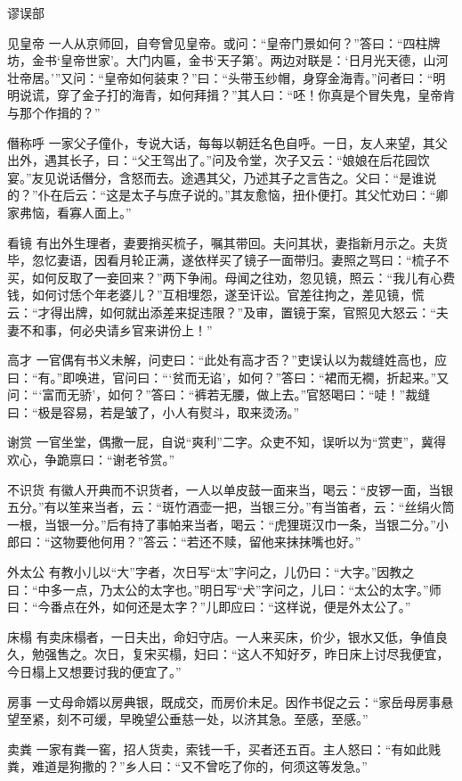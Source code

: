 \documentclass[12pt,UTF8]{ctexbook}
\begin{document}
谬误部

见皇帝
一人从京师回，自夸曾见皇帝。或问：“皇帝门景如何？”答曰：“四柱牌坊，金书‘皇帝世家’。大门内匾，金书‘天子第’。两边对联是：‘日月光天德，山河壮帝居。’”又问：“皇帝如何装束？”曰：“头带玉纱帽，身穿金海青。”问者曰：“明明说谎，穿了金子打的海青，如何拜揖？”其人曰：“呸！你真是个冒失鬼，皇帝肯与那个作揖的？”

僭称呼
一家父子僮仆，专说大话，每每以朝廷名色自呼。一日，友人来望，其父出外，遇其长子，曰：“父王驾出了。”问及令堂，次子又云：“娘娘在后花园饮宴。”友见说话僭分，含怒而去。途遇其父，乃述其子之言告之。父曰：“是谁说的？”仆在后云：“这是太子与庶子说的。”其友愈恼，扭仆便打。其父忙劝曰：“卿家弗恼，看寡人面上。”

看镜
有出外生理者，妻要捎买梳子，嘱其带回。夫问其状，妻指新月示之。夫货毕，忽忆妻语，因看月轮正满，遂依样买了镜子一面带归。妻照之骂曰：“梳子不买，如何反取了一妾回来？”两下争闹。母闻之往劝，忽见镜，照云：“我儿有心费钱，如何讨恁个年老婆儿？”互相埋怨，遂至讦讼。官差往拘之，差见镜，慌云：“才得出牌，如何就出添差来捉违限？”及审，置镜于案，官照见大怒云：“夫妻不和事，何必央请乡官来讲份上！”

高才
一官偶有书义未解，问吏曰：“此处有高才否？”吏误认以为裁缝姓高也，应曰：“有。”即唤进，官问曰：“‘贫而无谄’，如何？”答曰：“裙而无襉，折起来。”又问：“‘富而无骄’，如何？”答曰：“裤若无腰，做上去。”官怒喝曰：“唗！”裁缝曰：“极是容易，若是皱了，小人有熨斗，取来烫汤。”

谢赏
一官坐堂，偶撒一屁，自说“爽利”二字。众吏不知，误听以为“赏吏”，冀得欢心，争跪禀曰：“谢老爷赏。”

不识货
有徽人开典而不识货者，一人以单皮鼓一面来当，喝云：“皮锣一面，当银五分。”有以笙来当者，云：“斑竹酒壶一把，当银三分。”有当笛者，云：“丝绢火筒一根，当银一分。”后有持了事帕来当者，喝云：“虎狸斑汉巾一条，当银二分。”小郎曰：“这物要他何用？”答云：“若还不赎，留他来抹抹嘴也好。”

外太公
有教小儿以“大”字者，次日写“太”字问之，儿仍曰：“大字。”因教之曰：“中多一点，乃太公的太字也。”明日写“犬”字问之，儿曰：“太公的太字。”师曰：“今番点在外，如何还是太字？”儿即应曰：“这样说，便是外太公了。”

床榻
有卖床榻者，一日夫出，命妇守店。一人来买床，价少，银水又低，争值良久，勉强售之。次日，复宋买榻，妇曰：“这人不知好歹，昨日床上讨尽我便宜，今日榻上又想要讨我的便宜了。”

房事
一丈母命婿以房典银，既成交，而房价未足。因作书促之云：“家岳母房事悬望至紧，刻不可缓，早晚望公垂慈一处，以济其急。至感，至感。”

卖粪
一家有粪一窖，招人货卖，索钱一千，买者还五百。主人怒曰：“有如此贱粪，难道是狗撒的？”乡人曰：“又不曾吃了你的，何须这等发急。”
\end{document}
